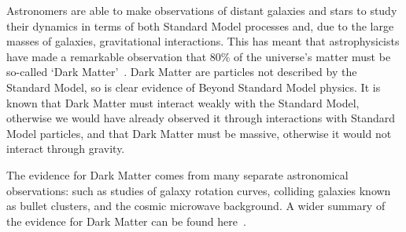
Astronomers are able to make observations of distant galaxies and stars
to study their dynamics in terms of both Standard Model processes
and, due to the large masses of galaxies, gravitational interactions.
This has meant that astrophysicists have made a remarkable observation that
80\% of the universe's matter must be so-called `Dark Matter'~\cite{theo-bsm_dm_peskin}.
Dark Matter are particles not described by the Standard Model,
so is clear evidence of Beyond Standard Model physics.
It is known that Dark Matter must interact weakly with the Standard Model,
otherwise we would have already observed it through interactions with Standard Model particles,
and that Dark Matter must be massive, otherwise it would not interact through gravity.

The evidence for Dark Matter comes from many separate astronomical observations:
such as studies of
galaxy rotation curves,
colliding galaxies known as bullet clusters,
and the cosmic microwave background.
A wider summary of the evidence for Dark Matter can be found here~\cite{theo-bsm_dm_evidence}.

